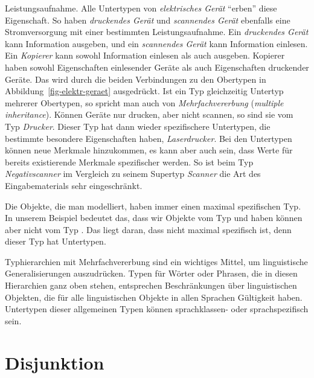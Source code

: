 Leistungsaufnahme. Alle Untertypen von \textit{elektrisches Gerät} "`erben"' diese Eigenschaft. So haben
\zb \textit{druckendes Gerät} und \textit{scannendes Gerät} ebenfalls eine Stromversorgung mit einer
bestimmten Leistungsaufnahme. Ein \textit{druckendes Gerät} kann Information ausgeben, und ein \textit{scannendes Gerät}
kann Information einlesen. Ein \textit{Kopierer} kann sowohl Information einlesen als auch ausgeben.
Kopierer haben sowohl Eigenschaften einlesender Geräte als auch Eigenschaften druckender Geräte. Das wird
durch die beiden Verbindungen zu den Obertypen in Abbildung~\ref{fig-elektr-geraet} ausgedrückt.
Ist ein Typ gleichzeitig Untertyp mehrerer Obertypen, so spricht man auch von \emph{Mehrfachvererbung}
(\emph{multiple inheritance}). Können Geräte nur drucken, aber nicht scannen, so sind sie vom Typ
\emph{Drucker}. Dieser Typ hat dann wieder spezifischere Untertypen, die bestimmte besondere Eigenschaften
haben, \zb \textit{Laserdrucker}. Bei den Untertypen können neue Merkmale hinzukommen, es kann aber
auch sein, dass Werte für bereits existierende Merkmale spezifischer werden. So ist \zb beim
Typ \textit{Negativscanner} im Vergleich zu seinem Supertyp \textit{Scanner} 
die Art des Eingabematerials sehr eingeschränkt. 

Die Objekte, die man modelliert, haben immer einen maximal spezifischen Typ. In unserem Beispiel
bedeutet das, dass wir Objekte vom Typ  und  haben können aber nicht
vom Typ . Das liegt daran, dass  nicht maximal
spezifisch ist, denn dieser Typ hat Untertypen.

Typhierarchien mit Mehrfachvererbung sind ein wichtiges Mittel, um linguistische Generalisierungen
auszudrücken. Typen für Wörter oder Phrasen, die in diesen Hierarchien ganz oben stehen, entsprechen
Beschränkungen über linguistischen Objekten, die für alle linguistischen Objekte in allen Sprachen
Gültigkeit haben. Untertypen dieser allgemeinen Typen können sprachklassen- oder sprachspezifisch sein.%

\section{Disjunktion}


